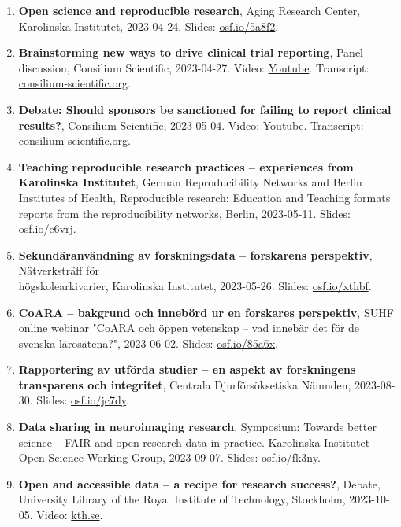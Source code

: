 \documentclass[10pt]{article}
\begin{document}
\begin{enumerate}[nolistsep]
\item \textbf{Open science and reproducible research}, Aging Research Center, Karolinska Institutet, 2023-04-24. Slides: \href{https://osf.io/5a8f2}{osf.io/5a8f2}.
\item \textbf{Brainstorming new ways to drive clinical trial reporting}, Panel discussion, Consilium Scientific, 2023-04-27. Video: 
\href{https://www.youtube.com/watch?v=HohWoE3bMi0}{Youtube}. Transcript: \href{https://consilium-scientific.org/2022-02-17-09-37-19/108-transcript-23/401-brainstorming-new-ways-to-drive-clinical-trial-reporting}{consilium-scientific.org}.
\item \textbf{Debate: Should sponsors be sanctioned for failing to report clinical results?}, Consilium Scientific, 2023-05-04. Video: \href{https://www.youtube.com/watch?v=IjsGeVlkXeE}{Youtube}. Transcript: \href{https://consilium-scientific.org/2022-02-17-09-37-19/108-transcript-23/406-debate-should-sponsors-be-sanctioned-for-failing-to-report-clinical-results}{consilium-scientific.org}.
\item \textbf{Teaching reproducible research practices – experiences from Karolinska Institutet}, German Reproducibility Networks and Berlin Institutes of Health, Reproducible research: Education and Teaching formats reports from the reproducibility networks, Berlin, 2023-05-11. Slides: \href{https://osf.io/e6vrj}{osf.io/e6vrj}.
\item \textbf{Sekundäranvändning av forskningsdata – forskarens perspektiv}, Nätverksträff för \\
högskolearkivarier, Karolinska Institutet, 2023-05-26. Slides: \href{https://osf.io/xthbf}{osf.io/xthbf}.
\item \textbf{CoARA – bakgrund och innebörd ur en forskares perspektiv}, SUHF online webinar "CoARA och öppen vetenskap – vad innebär det för de svenska lärosätena?", 2023-06-02. Slides: \href{https://osf.io/85a6x}{osf.io/85a6x}.
\item \textbf{Rapportering av utförda studier – en aspekt av forskningens transparens och integritet}, Centrala Djurförsöksetiska Nämnden, 2023-08-30. Slides: \href{https://osf.io/jc7dy}{osf.io/jc7dy}.
\item \textbf{Data sharing in neuroimaging research}, Symposium: Towards better science – FAIR and open research data in practice. Karolinska Institutet Open Science Working Group, 2023-09-07. Slides: \href{https://osf.io/fk3ny}{osf.io/fk3ny}.
\item \textbf{Open and accessible data – a recipe for research success?}, Debate, University Library of the Royal Institute of Technology, Stockholm, 2023-10-05. Video: \href{https://www.kth.se/en/biblioteket/kalender/evenemang/oppen-och-tillganglig-data-framgangsrecept-for-forskning-1.1270470}{kth.se}.

\end{enumerate}
\end{document}
